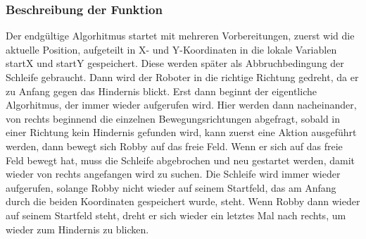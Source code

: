 \subsubsection*{Beschreibung der Funktion}
Der endgültige Algorhitmus startet mit mehreren Vorbereitungen, zuerst wid die aktuelle Position, aufgeteilt in X- und Y-Koordinaten in die lokale Variablen startX und startY gespeichert. Diese werden später als Abbruchbedingung der Schleife gebraucht. Dann wird der Roboter in die richtige Richtung gedreht, da er zu Anfang gegen das Hindernis blickt.
Erst dann beginnt der eigentliche Algorhitmus, der immer wieder aufgerufen wird. Hier werden dann nacheinander, von rechts beginnend die einzelnen Bewegungsrichtungen abgefragt, sobald in einer Richtung kein Hindernis gefunden wird, kann zuerst eine Aktion ausgeführt werden, dann bewegt sich Robby auf das freie Feld. Wenn er sich auf das freie Feld bewegt hat, muss die Schleife abgebrochen und neu gestartet werden, damit wieder von rechts angefangen wird zu suchen. Die Schleife wird immer wieder aufgerufen, solange Robby nicht wieder auf seinem Startfeld, das am Anfang durch die beiden Koordinaten gespeichert wurde, steht.
Wenn Robby dann wieder auf seinem Startfeld steht, dreht er sich wieder ein letztes Mal nach rechts, um wieder zum Hindernis zu blicken.
